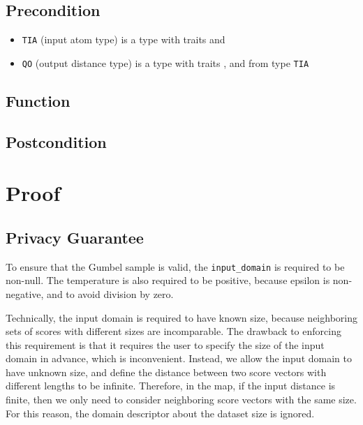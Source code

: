 \documentclass{article}
\begin{document}
\subsection*{Precondition}
\begin{itemize}
    \item \texttt{TIA} (input atom type) is a type with traits  and 

    \item \texttt{QO} (output distance type) is a type with traits , 
     and
     from type \texttt{TIA}
\end{itemize}

\subsection*{Function}
\label{sec:python-pseudocode}


\subsection*{Postcondition}


\section{Proof}
\subsection{Privacy Guarantee}

To ensure that the Gumbel sample is valid, the \texttt{input\_domain} is required to be non-null.
The temperature is also required to be positive, because epsilon is non-negative,
and to avoid division by zero.

Technically, the input domain is required to have known size, because neighboring sets of scores with different sizes are incomparable.
The drawback to enforcing this requirement is that it requires the user to specify the size of the input domain in advance, which is inconvenient.
Instead, we allow the input domain to have unknown size, and define the distance between two score vectors with different lengths to be infinite.
Therefore, in the map, if the input distance is finite, then we only need to consider neighboring score vectors with the same size.
For this reason, the domain descriptor about the dataset size is ignored.
\end{document}
